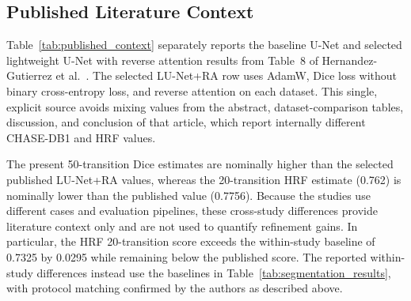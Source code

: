 \documentclass[jimaging,article,submit,pdftex,moreauthors]
  {Definitions/mdpi}
\begin{document}
\subsection{Published Literature Context}

Table~\ref{tab:published_context} separately reports the baseline U-Net and selected lightweight U-Net with reverse attention results from Table~8 of Hernandez-Gutierrez et al.~\cite{Hernandez2025}. The selected LU-Net+RA row uses AdamW, Dice loss without binary cross-entropy loss, and reverse attention on each dataset. This single, explicit source avoids mixing values from the abstract, dataset-comparison tables, discussion, and conclusion of that article, which report internally different CHASE-DB1 and HRF values.

\begin{table}[htbp]
\centering
\caption{Published contextual results from Table~8 of Hernandez-Gutierrez et al.~\cite{Hernandez2025}. These values were obtained under that study's partitioning, validation, preprocessing, and metric procedures and are not controlled before-refinement measurements for Table~\ref{tab:segmentation_results}.}
\label{tab:published_context}
\small
{}
\end{table}

The present 50-transition Dice estimates are nominally higher than the selected published LU-Net+RA values, whereas the 20-transition HRF estimate (0.762) is nominally lower than the published value (0.7756). Because the studies use different cases and evaluation pipelines, these cross-study differences provide literature context only and are not used to quantify refinement gains. In particular, the HRF 20-transition score exceeds the within-study baseline of 0.7325 by 0.0295 while remaining below the published score. The reported within-study differences instead use the baselines in Table~\ref{tab:segmentation_results}, with protocol matching confirmed by the authors as described above.
\end{document}
